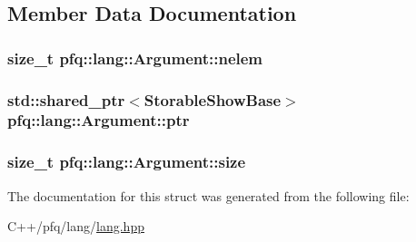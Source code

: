 \subsection{Member Data Documentation}
\hypertarget{structpfq_1_1lang_1_1Argument_a124d3646401b91728340221c59ca884e}{
\subsubsection[{nelem}]{\setlength{\rightskip}{0pt plus 5cm}size\+\_\+t pfq\+::lang\+::\+Argument\+::nelem}}\label{structpfq_1_1lang_1_1Argument_a124d3646401b91728340221c59ca884e}
\hypertarget{structpfq_1_1lang_1_1Argument_a74137962d82bf5a018d684c04149e446}{
\subsubsection[{ptr}]{\setlength{\rightskip}{0pt plus 5cm}std\+::shared\+\_\+ptr$<${\bf Storable\+Show\+Base}$>$ pfq\+::lang\+::\+Argument\+::ptr}}\label{structpfq_1_1lang_1_1Argument_a74137962d82bf5a018d684c04149e446}
\hypertarget{structpfq_1_1lang_1_1Argument_a0ce45c4283dc6a97dbf142cb9de211df}{
\subsubsection[{size}]{\setlength{\rightskip}{0pt plus 5cm}size\+\_\+t pfq\+::lang\+::\+Argument\+::size}}\label{structpfq_1_1lang_1_1Argument_a0ce45c4283dc6a97dbf142cb9de211df}


The documentation for this struct was generated from the following file\+:\begin{DoxyCompactItemize}
\item 
C++/pfq/lang/\hyperlink{lang_8hpp}{lang.\+hpp}\end{DoxyCompactItemize}
